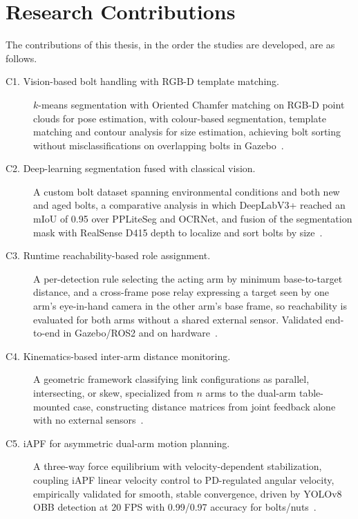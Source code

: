 \section{Research Contributions}\label{sec:intro_contributions}

The contributions of this thesis, in the order the studies are developed, are as follows.

\begin{description}
    \item[C1. Vision-based bolt handling with RGB-D template matching.] $k$-means segmentation
    with Oriented Chamfer matching on RGB-D point clouds for pose estimation, with colour-based
    segmentation, template matching and contour analysis for size estimation, achieving bolt sorting without misclassifications on overlapping bolts in Gazebo~\citep{sk2024bolthandling}.

    \item[C2. Deep-learning segmentation fused with classical vision.] A custom bolt dataset
    spanning environmental conditions and both new and aged bolts, a comparative analysis in which
    DeepLabV3+ reached an mIoU of 0.95 over PPLiteSeg and OCRNet, and fusion of the segmentation
    mask with RealSense D415 depth to localize and sort bolts by size~\citep{sk2024boltsorting}.

    \item[C3. Runtime reachability-based role assignment.] A per-detection rule selecting the
    acting arm by minimum base-to-target distance, and a cross-frame pose relay expressing a target
    seen by one arm's eye-in-hand camera in the other arm's base frame, so reachability is evaluated
    for both arms without a shared external sensor. Validated end-to-end in Gazebo/ROS2 and on
    hardware~\citep{sk2025sharedvision}.

    \item[C4. Kinematics-based inter-arm distance monitoring.] A geometric framework classifying
    link configurations as parallel, intersecting, or skew, specialized from $n$ arms to the
    dual-arm table-mounted case, constructing distance matrices from joint feedback alone with no
    external sensors~\citep{sk2025distance}.

    \item[C5. iAPF for asymmetric dual-arm motion planning.] A three-way force equilibrium with
    velocity-dependent stabilization, coupling iAPF linear velocity control to PD-regulated angular
    velocity, empirically validated for smooth, stable convergence, driven by YOLOv8 OBB detection
    at 20 FPS with 0.99/0.97 accuracy for bolts/nuts~\citep{surya2025iapf}.


\end{description}
